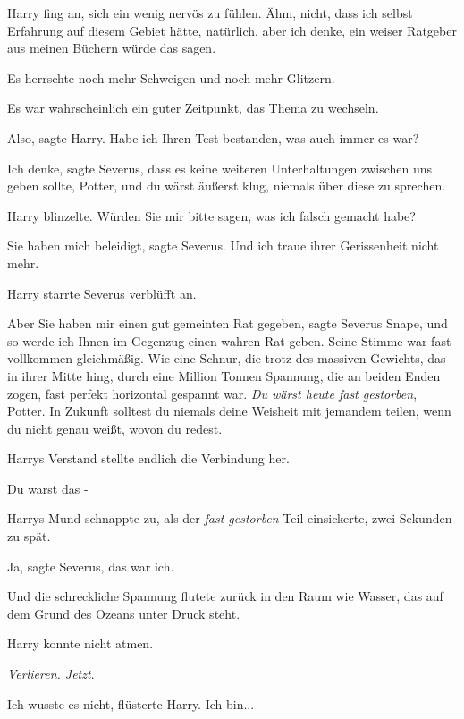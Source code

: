 Harry fing an, sich ein wenig nervös zu fühlen. \glqq{}Ähm, nicht, dass ich
selbst Erfahrung auf diesem Gebiet hätte, natürlich, aber ich denke, ein weiser
Ratgeber aus meinen Büchern würde das sagen.\grqq{}

Es herrschte noch mehr Schweigen und noch mehr Glitzern.

Es war wahrscheinlich ein guter Zeitpunkt, das Thema zu wechseln.

\glqq{}Also\grqq{}, sagte Harry. \glqq{}Habe ich Ihren Test bestanden, was auch
immer es war?\grqq{}

\glqq{}Ich denke\grqq{}, sagte Severus, \glqq{}dass es keine weiteren
Unterhaltungen zwischen uns geben sollte, Potter, und du wärst äußerst klug,
niemals über diese zu sprechen.\grqq{}

Harry blinzelte. \glqq{}Würden Sie mir bitte sagen, was ich falsch gemacht
habe?\grqq{}

\glqq{}Sie haben mich beleidigt\grqq{}, sagte Severus. \glqq{}Und ich traue
ihrer Gerissenheit nicht mehr.\grqq{}

Harry starrte Severus verblüfft an.

\glqq{}Aber Sie haben mir einen gut gemeinten Rat gegeben\grqq{}, sagte Severus
Snape, \glqq{}und so werde ich Ihnen im Gegenzug einen wahren Rat geben.\grqq{}
Seine Stimme war fast vollkommen gleichmäßig. Wie eine Schnur, die trotz des
massiven Gewichts, das in ihrer Mitte hing, durch eine Million Tonnen Spannung,
die an beiden Enden zogen, fast perfekt horizontal gespannt war. \glqq{}\emph{Du
wärst heute fast gestorben}, Potter. In Zukunft solltest du niemals deine
Weisheit mit jemandem teilen, wenn du nicht genau weißt, wovon du redest.\grqq{}

Harrys Verstand stellte endlich die Verbindung her.

\glqq{}Du warst das -\grqq{}


Harrys Mund schnappte zu, als der \glqq{}\emph{fast gestorben}\grqq{} Teil
einsickerte, zwei Sekunden zu spät.

\glqq{}Ja\grqq{}, sagte Severus, \glqq{}das war ich.\grqq{}

Und die schreckliche Spannung flutete zurück in den Raum wie Wasser, das auf dem
Grund des Ozeans unter Druck steht.

Harry konnte nicht atmen.

\emph{Verlieren. Jetzt}.

\glqq{}Ich wusste es nicht\grqq{}, flüsterte Harry. \glqq{}Ich bin...\grqq{}

